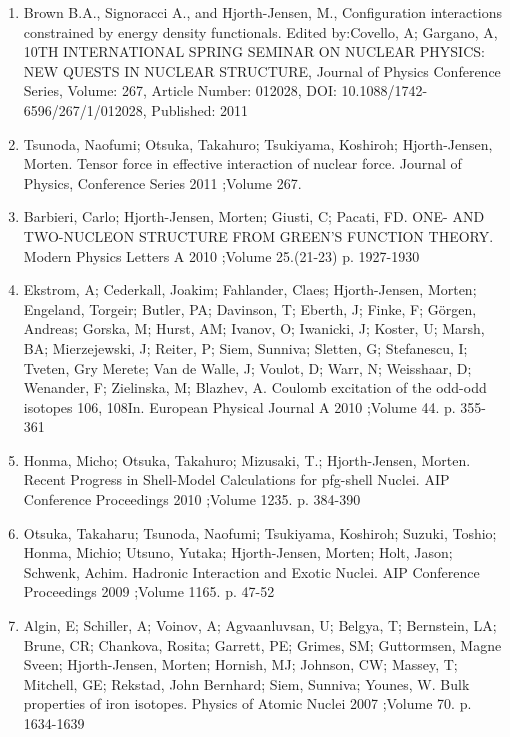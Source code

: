\documentclass[%
oneside,                 %
final,                   %
10pt]{article}
\begin{document}
\begin{enumerate}
\item Brown B.A., Signoracci A., and Hjorth-Jensen, M., Configuration interactions constrained by energy density functionals. Edited by:Covello, A; Gargano, A, 10TH INTERNATIONAL SPRING SEMINAR ON NUCLEAR PHYSICS: NEW QUESTS IN NUCLEAR STRUCTURE, Journal of Physics Conference Series, Volume: 267, Article Number: 012028, DOI: 10.1088/1742-6596/267/1/012028, Published: 2011

\item Tsunoda, Naofumi; Otsuka, Takahuro; Tsukiyama, Koshiroh; Hjorth-Jensen, Morten. Tensor force in effective interaction of nuclear force. Journal of Physics, Conference Series 2011 ;Volume 267.

\item Barbieri, Carlo; Hjorth-Jensen, Morten; Giusti, C; Pacati, FD. ONE- AND TWO-NUCLEON STRUCTURE FROM GREEN'S FUNCTION THEORY. Modern Physics Letters A 2010 ;Volume 25.(21-23) p. 1927-1930

\item Ekstrom, A; Cederkall, Joakim; Fahlander, Claes; Hjorth-Jensen, Morten; Engeland, Torgeir; Butler, PA; Davinson, T; Eberth, J; Finke, F; Görgen, Andreas; Gorska, M; Hurst, AM; Ivanov, O; Iwanicki, J; Koster, U; Marsh, BA; Mierzejewski, J; Reiter, P; Siem, Sunniva; Sletten, G; Stefanescu, I; Tveten, Gry Merete; Van de Walle, J; Voulot, D; Warr, N; Weisshaar, D; Wenander, F; Zielinska, M; Blazhev, A.  Coulomb excitation of the odd-odd isotopes 106, 108In. European Physical Journal A 2010 ;Volume 44. p. 355-361

\item Honma, Micho; Otsuka, Takahuro; Mizusaki, T.; Hjorth-Jensen, Morten.  Recent Progress in Shell-Model Calculations for pfg-shell Nuclei. AIP Conference Proceedings 2010 ;Volume 1235. p. 384-390

\item Otsuka, Takaharu; Tsunoda, Naofumi; Tsukiyama, Koshiroh; Suzuki, Toshio; Honma, Michio; Utsuno, Yutaka; Hjorth-Jensen, Morten; Holt, Jason; Schwenk, Achim.  Hadronic Interaction and Exotic Nuclei. AIP Conference Proceedings 2009 ;Volume 1165. p. 47-52

\item Algin, E; Schiller, A; Voinov, A; Agvaanluvsan, U; Belgya, T; Bernstein, LA; Brune, CR; Chankova, Rosita; Garrett, PE; Grimes, SM; Guttormsen, Magne Sveen; Hjorth-Jensen, Morten; Hornish, MJ; Johnson, CW; Massey, T; Mitchell, GE; Rekstad, John Bernhard; Siem, Sunniva; Younes, W.  Bulk properties of iron isotopes. Physics of Atomic Nuclei 2007 ;Volume 70. p. 1634-1639


\end{enumerate}
\end{document}
